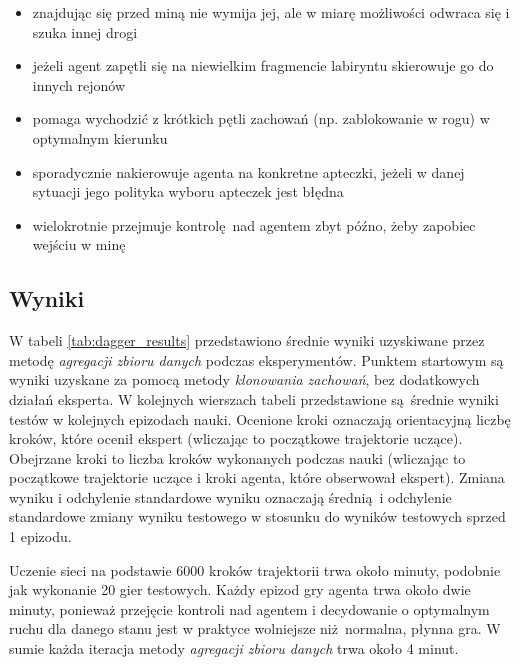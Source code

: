 \begin{itemize}
\item{znajdując się przed miną nie wymija jej, ale w miarę możliwości odwraca się i szuka innej drogi}
\item{jeżeli agent zapętli się na niewielkim fragmencie labiryntu skierowuje go do innych rejonów}
\item{pomaga wychodzić z krótkich pętli zachowań (np. zablokowanie w rogu) w optymalnym kierunku}
\item{sporadycznie nakierowuje agenta na konkretne apteczki, jeżeli w danej sytuacji jego polityka wyboru apteczek jest błędna}
\item{wielokrotnie przejmuje kontrolę nad agentem zbyt późno, żeby zapobiec wejściu w minę}
\end{itemize}


\subsection{Wyniki}\label{dagger_results}
W tabeli \ref{tab:dagger_results} przedstawiono średnie wyniki uzyskiwane przez metodę \textit{agregacji zbioru danych} podczas eksperymentów. Punktem startowym są wyniki uzyskane za pomocą metody \textit{klonowania zachowań}, bez dodatkowych działań eksperta. W kolejnych wierszach tabeli przedstawione są średnie wyniki testów w kolejnych epizodach nauki. Ocenione kroki oznaczają orientacyjną liczbę kroków, które ocenił ekspert (wliczając to początkowe trajektorie uczące). Obejrzane kroki to liczba kroków wykonanych podczas nauki (wliczając to początkowe trajektorie uczące i kroki agenta, które obserwował ekspert). Zmiana wyniku i odchylenie standardowe wyniku oznaczają średnią i odchylenie standardowe zmiany wyniku testowego w stosunku do wyników testowych sprzed 1 epizodu. 

Uczenie sieci na podstawie 6000 kroków trajektorii trwa około minuty, podobnie jak wykonanie 20 gier testowych. Każdy epizod gry agenta trwa około dwie minuty, ponieważ przejęcie kontroli nad agentem i decydowanie o optymalnym ruchu dla danego stanu jest w praktyce wolniejsze niż normalna, płynna gra. W sumie każda iteracja metody \textit{agregacji zbioru danych} trwa około 4 minut.

\begin{figure}[H]
\end{figure}

